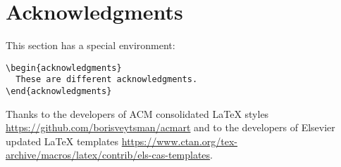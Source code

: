 \documentclass[
]{ceurart}
\begin{document}
\section{Acknowledgments}


This section has a special environment:
\begin{verbatim}
\begin{acknowledgments}
  These are different acknowledgments.
\end{acknowledgments}
\end{verbatim}



\iffalse
Start the appendix with the ``\verb|appendix|'' command:
\begin{verbatim}
\appendix
\end{verbatim}
and note that in the appendix, sections are lettered, not
numbered. 
\fi
\begin{acknowledgments}
  Thanks to the developers of ACM consolidated LaTeX styles
  \url{https://github.com/borisveytsman/acmart} and to the developers
  of Elsevier updated \LaTeX{} templates
  \url{https://www.ctan.org/tex-archive/macros/latex/contrib/els-cas-templates}.  
\end{acknowledgments}
\end{document}

